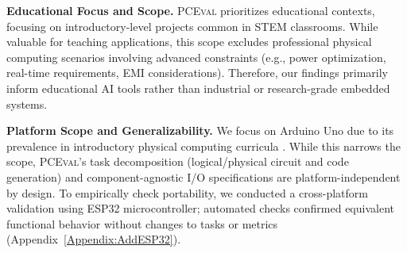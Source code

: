 \documentclass{article} %
\begin{document}
\textbf{Educational Focus and Scope.} \;
\textsc{PCEval} prioritizes educational contexts, focusing on introductory-level projects common in STEM classrooms.
While valuable for teaching applications, this scope excludes professional physical computing scenarios involving advanced constraints (e.g., power optimization, real-time requirements, EMI considerations).
Therefore, our findings primarily inform educational AI tools rather than industrial or research-grade embedded systems.

\textbf{Platform Scope and Generalizability.} \;
We focus on Arduino Uno due to its prevalence in introductory physical computing curricula \citep{el2017review,garcia2023use,schatz2024analysis}. 
While this narrows the scope, \textsc{PCEval}'s task decomposition (logical/physical circuit and code generation) and component-agnostic I/O specifications are platform-independent by design. 
To empirically check portability, we conducted a cross-platform validation using ESP32 microcontroller; automated checks confirmed equivalent functional behavior without changes to tasks or metrics (Appendix~\ref{Appendix:AddESP32}).
\end{document}
